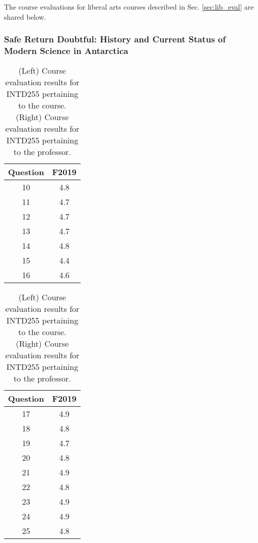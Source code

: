 \documentclass[../../../main.tex]{subfiles}
\begin{document}
The course evaluations for liberal arts courses described in Sec. \ref{sec:lib_eval} are shared below.

\subsubsection{Safe Return Doubtful: History and Current Status of Modern Science in Antarctica}

\begin{table}
\footnotesize
\centering
\begin{tabular}{| c | c |}
\hline
\hline
Question & F2019 \\ \hline
10 & 4.8 \\ \hline
11 & 4.7 \\ \hline
12 & 4.7 \\ \hline
13 & 4.7 \\ \hline
14 & 4.8 \\ \hline
15 & 4.4 \\ \hline
16 & 4.6 \\ \hline
\hline
\end{tabular}
\begin{tabular}{| c | c |}
\hline
\hline
Question & F2019 \\ \hline
17 & 4.9 \\ \hline
18 & 4.8 \\ \hline
19 & 4.7 \\ \hline
20 & 4.8 \\ \hline
21 & 4.9 \\ \hline
22 & 4.8 \\ \hline
23 & 4.9 \\ \hline
24 & 4.9 \\ \hline
25 & 4.8 \\ \hline
\hline
\end{tabular}
\caption{\label{tab:eval_255} (Left) Course evaluation results for INTD255 pertaining to the course.  (Right) Course evaluation results for INTD255 pertaining to the professor.}
\end{table}
\end{document}
